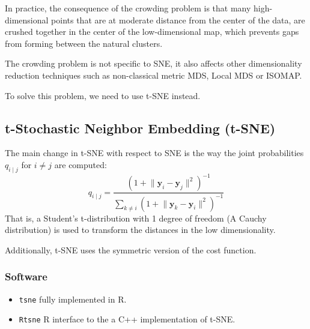 \begin{marker}
	In practice, the consequence of the crowding problem is that many
	high-dimensional points that are at moderate distance from the
	center of the data, are crushed together in the center of the
	low-dimensional map, which prevents gaps from forming between the
	natural clusters.
\end{marker}

The crowding problem is not specific to SNE, it also affects other
dimensionality reduction techniques such as non-classical metric MDS,
Local MDS or ISOMAP.

To solve this problem, we need to use t-SNE instead.

\subsection{t-Stochastic Neighbor Embedding (t-SNE)}

The main change in t-SNE with respect to SNE is the way the joint
probabilities $q_{i \mid j}$ for $i \neq j$ are computed:
\begin{equation*}
	q_{i \mid j} = \frac
	{
		(1 + \lVert \boldsymbol y_i - \boldsymbol y_j \rVert^2)^{-1}
	}{
		\sum_{k \neq i} (1 + \lVert \boldsymbol y_k - \boldsymbol y_i \rVert^2)^{-1}
	}
\end{equation*}
That is, a Student's t-distribution with 1 degree of freedom (A Cauchy distribution)
is used to transform the distances in the low dimensionality.

Additionally, t-SNE uses the symmetric version of the cost function.

\subsubsection{Software}
\begin{itemize}
	\item \texttt{tsne} fully implemented in R.
	\item \texttt{Rtsne} R interface to the a C++ implementation of t-SNE.
\end{itemize}

